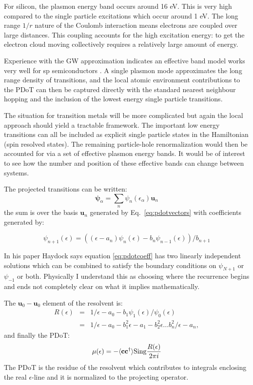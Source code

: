 For silicon, the plasmon energy band occurs around 16 eV. This is very high compared
to the single particle excitations which occur around 1 eV. The long range $1/r$ nature of the Coulomb
interaction means electrons are coupled over large distances.
This coupling accounts for the high excitation energy: to get the
electron cloud moving collectively requires a relatively large amount of energy.

Experience with the GW approximation indicates an effective band model works very well
for sp semiconductors \cite{godbyneeds, hybertsenlouie, bergstressen}. 
A single plasmon mode approximates the long range density of transitions, and the local
atomic environment contributions to the PDoT can then be captured directly with the standard nearest
neighbour hopping and the inclusion of the lowest energy single particle transitions.

The situation for transition metals will be more complicated but again the local approach should yield 
a tractable framework. The important low energy transitions can all be included 
as explicit single particle states in the Hamiltonian (spin resolved states). 
The remaining particle-hole renormalization would then be accounted for 
via a set of effective plasmon energy bands. It would be of interest to
see how the number and position of these effective bands can change between systems.

The projected transitions can be written:
%
\begin{equation}
\mathbf{\psi}_{\alpha} = \sum_{n} \psi_{n}(\epsilon_{\alpha})\mathbf{u}_{n}
\end{equation}
%
the sum is over the basis ${\mathbf{u}_{n}}$ generated by Eq.~\ref{eq:pdotvectors}
with coefficients generated by:

\begin{equation}
\label{eq:pdotcoeff}
\psi_{n+1}(\epsilon) = ((\epsilon-a_{n})\psi_{n}(\epsilon) - b_{n}\psi_{n-1}(\epsilon))/b_{n+1}
\end{equation}

In his paper Haydock says equation \ref{eq:pdotcoeff} has two linearly independent solutions
which can be combined to satisfy the boundary conditions on $\psi_{N+1}$ or $\psi_{-1}$ or both.
Physically I understand this as choosing where the recurrence begins and ends not completely
clear on what it implies mathematically.

The $\mathbf{u}_{0}-\mathbf{u}_{0}$ element of the resolvent is:
%
\begin{eqnarray}
R(\epsilon)& = & 1/\epsilon-a_{0}-b_{1}\psi_{1}(\epsilon)/\psi_{0}(\epsilon) \\
  & = & 1/\epsilon-a_{0}-b^{2}_{1}\epsilon-a_{1}-b^{2}_{2}\epsilon...b_{n}^{2}/\epsilon-a_{n},
\end{eqnarray}
%
and finally the PDoT:
%
\begin{equation}
\mu(\epsilon) = -\langle \mathbf{c} \mathbf{c}^{\dagger}\rangle {\rm Sing} \frac{R(\epsilon)}{2\pi i}
\end{equation}
%
The PDoT is the residue of the resolvent which contributes to integrals enclosing the 
real $\epsilon$-line and it is normalized to the projecting operator.

